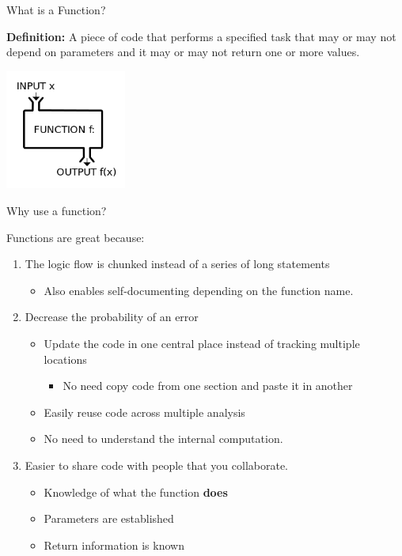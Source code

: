 \begin{frame}{What is a Function?}

\textbf{Definition:} A piece of code that performs a specified task that
may or may not depend on parameters and it may or may not return one or
more values.

\begin{center}\includegraphics[width=150px]{figures/function_machine} \end{center}

\end{frame}

\begin{frame}{Why use a function?}

Functions are great because:

\begin{enumerate}
\def\labelenumi{\arabic{enumi}.}
\tightlist
\item
  The logic flow is chunked instead of a series of long statements

  \begin{itemize}
  \tightlist
  \item
    Also enables self-documenting depending on the function name.
  \end{itemize}
\item
  Decrease the probability of an error

  \begin{itemize}
  \tightlist
  \item
    Update the code in one central place instead of tracking multiple
    locations

    \begin{itemize}
    \tightlist
    \item
      No need copy code from one section and paste it in another
    \end{itemize}
  \item
    Easily reuse code across multiple analysis
  \item
    No need to understand the internal computation.
  \end{itemize}
\item
  Easier to share code with people that you collaborate.

  \begin{itemize}
  \tightlist
  \item
    Knowledge of what the function \textbf{does}
  \item
    Parameters are established
  \item
    Return information is known
  \end{itemize}
\end{enumerate}

\end{frame}

